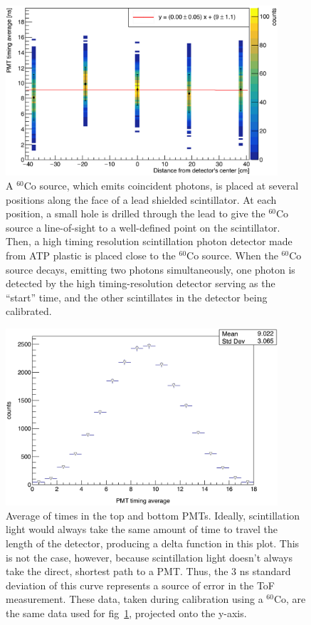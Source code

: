 \begin{figure}[H]
    \centering
    \includegraphics[width = 0.9\textwidth]{Content/Methods/CO60Validation.png}
    \caption{A $^{60}$Co source, which emits coincident photons, is placed at several positions along the face of a lead shielded scintillator.
    At each position, a small hole is drilled through the lead to give the $^{60}$Co source a line-of-sight to a well-defined point on the scintillator.
    Then, a high timing resolution scintillation photon detector made from ATP plastic is placed close to the $^{60}$Co source.
    When the $^{60}$Co source decays, emitting two photons simultaneously, one photon is detected by the high timing-resolution detector serving as the ``start'' time, and the other scintillates in the detector being calibrated.}
    \label{fig:Co60Validation}
\end{figure}
\begin{figure}
    \centering
    \includegraphics[width = 0.9\textwidth]{Content/Methods/CO60ValidationProject.png}
    \caption{Average of times in the top and bottom PMTs.
    Ideally, scintillation light would always take the same amount of time to travel the length of the detector, producing a delta function in this plot.
    This is not the case, however, because scintillation light doesn't always take the direct, shortest path to a PMT.
    Thus, the 3 ns standard deviation of this curve represents a source of error in the ToF measurement.
    These data, taken during calibration using a $^{60}$Co, are the same data used for fig~\ref{fig:Co60Validation}, projected onto the y-axis.
}
    \label{fig:Co60ValidationProject}
\end{figure}

